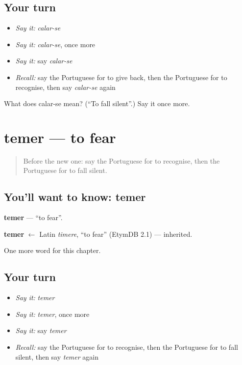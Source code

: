 \subsection*{Your turn}
\begin{itemize}
\raggedright
  \item \emph{Say it:} \emph{calar-se}
  \item \emph{Say it:} \emph{calar-se}, once more
  \item \emph{Say it:} say \emph{calar-se}
  \item \emph{Recall:} say the Portuguese for to give back, then the Portuguese for to recognise, then say \emph{calar-se} again
\end{itemize}

\begin{tcolorbox}[breakable,colback=teal!4,colframe=teal!35!black,title={Before you move on}]
What does calar-se mean? (\textquotedblleft{}To fall silent\textquotedblright{}.) Say it once more.
\end{tcolorbox}
\section[temer]{temer — to fear}

\label{lesson:PT-C144-temer}



\begin{quote}
Before the new one: say the Portuguese for to recognise, then the Portuguese for to fall silent.
\end{quote}

\subsection*{You'll want to know: temer}
\textbf{temer} — \textquotedblleft{}to fear\textquotedblright{}.

\begin{cousinweb}
\textbf{temer} $\leftarrow$ Latin \emph{timere}, \textquotedblleft{}to fear\textquotedblright{} (EtymDB 2.1) — inherited.
\end{cousinweb}

\begin{grammarlens}[title={What you've built}]
One more word for this chapter.
\end{grammarlens}

\subsection*{Your turn}
\begin{itemize}
\raggedright
  \item \emph{Say it:} \emph{temer}
  \item \emph{Say it:} \emph{temer}, once more
  \item \emph{Say it:} say \emph{temer}
  \item \emph{Recall:} say the Portuguese for to recognise, then the Portuguese for to fall silent, then say \emph{temer} again
\end{itemize}

